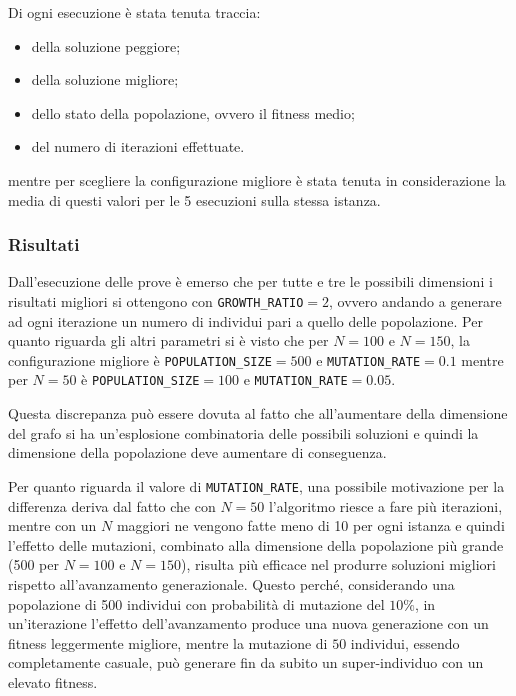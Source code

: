 Di ogni esecuzione è stata tenuta traccia:
\begin{itemize}
	\item della soluzione peggiore;
	\item della soluzione migliore;
	\item dello stato della popolazione, ovvero il fitness medio;
	\item del numero di iterazioni effettuate.
\end{itemize}

mentre per scegliere la configurazione migliore è stata tenuta in considerazione la media di questi valori per le 5 esecuzioni sulla stessa istanza.

\subsubsection{Risultati}

Dall'esecuzione delle prove è emerso che per tutte e tre le possibili dimensioni i risultati migliori si ottengono con \texttt{GROWTH\_RATIO}$= 2$, ovvero andando a generare ad ogni iterazione un numero di individui pari a quello delle popolazione. 
Per quanto riguarda gli altri parametri si è visto che per $N = 100$ e $N = 150$, la configurazione migliore è \texttt{POPULATION\_SIZE}$ = 500$  e \texttt{MUTATION\_RATE}$ = 0.1$ mentre per $N=50$ è \texttt{POPULATION\_SIZE}$ = 100$ e \texttt{MUTATION\_RATE}$ = 0.05$. 

Questa discrepanza può essere dovuta al fatto che all'aumentare della dimensione del grafo si ha un'esplosione combinatoria delle possibili soluzioni e quindi la dimensione della popolazione deve aumentare di conseguenza.

Per quanto riguarda il valore di \texttt{MUTATION\_RATE}, una possibile motivazione per la differenza deriva dal fatto che con $N=50$ l'algoritmo riesce a fare più iterazioni, mentre con un $N$ maggiori ne vengono fatte meno di 10 per ogni istanza e quindi l'effetto delle mutazioni, combinato alla dimensione della popolazione più grande (500 per $N=100$ e $N=150$), risulta più efficace nel produrre soluzioni migliori rispetto all'avanzamento generazionale. 
Questo perché, considerando una popolazione di 500 individui con probabilità di mutazione del $10\%$, in un'iterazione l'effetto dell'avanzamento produce una nuova generazione con un fitness leggermente migliore, mentre la mutazione di $50$ individui, essendo completamente casuale, può generare fin da subito un super-individuo con un elevato fitness.

